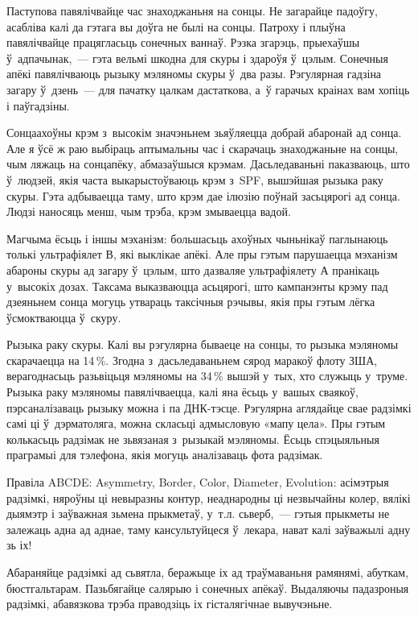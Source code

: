 Паступова павялічвайце час знаходжаньня на сонцы. Не загарайце падоўгу, асабліва калі да гэтага вы доўга не былі на сонцы. Патроху і плыўна павялічвайце працягласьць сонечных ваннаў. Рэзка згарэць, прыехаўшы ў~адпачынак,~--- гэта вельмі шкодна для скуры і здароўя ў~цэлым. Сонечныя апёкі павялічваюць рызыку мэляномы скуры ў~два разы. Рэгулярная гадзіна загару ў~дзень~--- для пачатку цалкам дастаткова, а~ў гарачых краінах вам хопіць і паўгадзіны.

Сонцаахоўны крэм з~высокім значэньнем зьяўляецца добрай абаронай ад сонца. Але я ўсё ж раю выбіраць аптымальны час і скарачаць знаходжаньне на сонцы, чым ляжаць на сонцапёку, абмазаўшыся крэмам. Дасьледаваньні паказваюць, што ў~людзей, якія часта выкарыстоўваюць крэм з~SPF, вышэйшая рызыка раку скуры. Гэта адбываецца таму, што крэм дае ілюзію поўнай засьцярогі ад сонца. Людзі наносяць менш, чым трэба, крэм змываецца вадой.

Магчыма ёсьць і іншы мэханізм: большасьць ахоўных чыньнікаў паглынаюць толькі ультрафіялет В, які выклікае апёкі. Але пры гэтым парушаецца мэханізм абароны скуры ад загару ў~цэлым, што дазваляе ультрафіялету А пранікаць у~высокіх дозах. Таксама выказваюцца асьцярогі, што кампанэнты крэму пад дзеяньнем сонца могуць утвараць таксічныя рэчывы, якія пры гэтым лёгка ўсмоктваюцца ў~скуру.

Рызыка раку скуры. Калі вы рэгулярна бываеце на сонцы, то рызыка мэляномы скарачаецца на 14\,\%. Згодна з~дасьледаваньнем сярод маракоў флоту ЗША, верагоднасьць разьвіцьця мэляномы на 34\,\% вышэй у~тых, хто служыць у~труме. Рызыка раку мэляномы павялічваецца, калі яна ёсьць у~вашых сваякоў, пэрсаналізаваць рызыку можна і па ДНК-тэсце. Рэгулярна аглядайце свае радзімкі самі ці ў~дэрматоляга, можна скласьці адмысловую «мапу цела». Пры гэтым колькасьць радзімак не зьвязаная з~рызыкай мэляномы. Ёсьць спэцыяльныя праграмыі для тэлефона, якія могуць аналізаваць фота радзімак.

Правіла ABCDE: Asymmetry, Border, Color, Diameter, Evolution: асімэтрыя радзімкі, няроўны ці невыразны контур, неаднародны ці незвычайны колер, вялікі дыямэтр і заўважная зьмена прыкметаў, у~т.л. сьверб,~--- гэтыя прыкметы не залежаць адна ад аднае, таму кансультуйцеся ў~лекара, нават калі заўважылі адну зь іх!

Абараняйце радзімкі ад сьвятла, беражыце іх ад траўмаваньня рамянямі, абуткам, бюстгальтарам. Пазьбягайце салярыю і сонечных апёкаў. Выдаляючы падазроныя радзімкі, абавязкова трэба праводзіць іх гісталягічнае вывучэньне.


